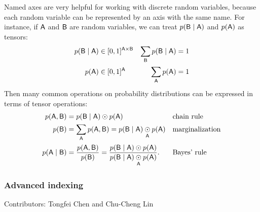 \documentclass{article}
\begin{document}
Named axes are very helpful for working with discrete random variables, because each random variable can be represented by an axis with the same name. For instance, if $\name{A}$ and $\name{B}$ are random variables, we can treat $p(\name{B} \mid \name{A})$ and $p(\name{A})$ as tensors:
\begin{align*}
p(\name{B} \mid \name{A}) &\in [0, 1]^{\name{A} \times \name{B}} & \nsum{\name{B}} p(\name{B} \mid \name{A}) &= 1 \\
p(\name{A}) &\in [0, 1]^{\name{A}} & \nsum{\name{A}} p(\name{A}) &= 1
\end{align*}
Then many common operations on probability distributions can be expressed in terms of tensor operations:
\begin{align*}
p(\name{A}, \name{B}) &= p(\name{B} \mid \name{A}) \odot p(\name{A}) && \text{chain rule}\\
p(\name{B}) &= \nsum{\name{A}} p(\name{A}, \name{B}) = p(\name{B} \mid \name{A}) \ndot{\name{A}} p(\name{A}) && \text{marginalization} \\
p(\name{A} \mid \name{B}) &= \frac{p(\name{A}, \name{B})}{p(\name{B})} = \frac{p(\name{B} \mid \name{A}) \odot p(\name{A})}{p(\name{B} \mid \name{A}) \ndot{\name{A}} p(\name{A})}. && \text{Bayes' rule}
\end{align*}

\subsubsection{Advanced indexing}

Contributors: Tongfei Chen and Chu-Cheng Lin
\end{document}
